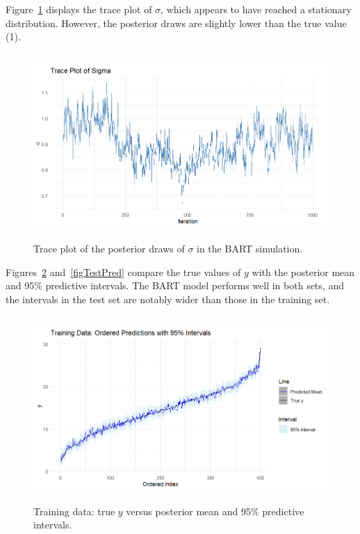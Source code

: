 Figure~\ref{figTraceplotsig} displays the trace plot of \(\sigma\), which appears to have reached a stationary distribution. However, the posterior draws are slightly lower than the true value (1).

\begin{figure}[!h]
	\centering
	\includegraphics[width=340pt, height=200pt]{Chapters/chapter13/figures/Traceplotsig.png}
	\caption{Trace plot of the posterior draws of \(\sigma\) in the BART simulation.}
	\label{figTraceplotsig}
\end{figure}

Figures~\ref{figTrainingPred} and~\ref{figTestPred} compare the true values of \(y\) with the posterior mean and 95\% predictive intervals. The BART model performs well in both sets, and the intervals in the test set are notably wider than those in the training set.

\begin{figure}[!h]
	\centering
	\includegraphics[width=340pt, height=200pt]{Chapters/chapter13/figures/TrainingPred.png}
	\caption{Training data: true \(y\) versus posterior mean and 95\% predictive intervals.}
	\label{figTrainingPred}
\end{figure}


